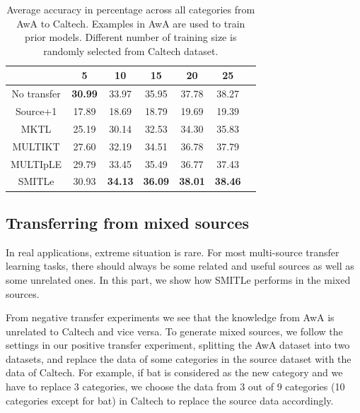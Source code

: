 \begin{table}[htbp]
  \centering
  \caption{Average accuracy in percentage across all categories from AwA to Caltech. Examples in AwA are used to train prior models. Different number of training size is randomly selected from Caltech dataset.}
    \begin{tabular}{ccccccc}
    \toprule
                & 5              & 10             & 15             & 20             & 25             \\
    \midrule
    No transfer &         \textbf{ 30.99 } &         33.97  &         35.95 &         37.78  &         38.27   \\
    Source+1    &         17.89  &         18.69  &         18.79  &         19.69  &         19.39          \\
    MKTL        &         25.19  &         30.14  &         32.53  &         34.30  &         35.83  \\
    MULTIKT     &         27.60  &         32.19  &         34.51  &         36.78  &         37.79  \\
    MULTIpLE    &         29.79  &         33.45  &         35.49  &         36.77  &         37.43  \\
    SMITLe        &       30.93  &         \textbf{ 34.13 } &         \textbf{  36.09 } &         \textbf{38.01} &         \textbf{38.46} \\
    \bottomrule
    \end{tabular}%
  \label{tab:A2C}%
\end{table}%

\subsection{Transferring from mixed sources}
In real applications, extreme situation is rare. For most multi-source transfer learning tasks, there should always be some related and useful sources as well as some unrelated ones. In this part, we show how SMITLe performs in the mixed sources.

From negative transfer experiments we see that the knowledge from AwA is unrelated to Caltech and vice versa. To generate mixed sources, we follow the settings in our positive transfer experiment, splitting the AwA dataset into two datasets, and replace the data of some categories in the source dataset with the data of Caltech. 
For example, if bat is considered as the new category and we have to replace 3 categories, we choose the data from 3 out of 9 categories (10 categories except for bat) in Caltech to replace the source data accordingly. 

